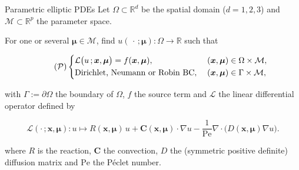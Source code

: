 \begin{frame}{Parametric elliptic PDEs}
	Let $\Omega \subset \mathbb{R}^d$ be the spatial domain ($d=1,2,3$) and $\mathcal{M} \subset \mathbb{R}^p$ the parameter space.

	For one or several $\bm{\mu}\in \mathcal{M}$, find $u(\,\cdot\,;\bm{\mu}): \Omega\to \mathbb{R}$ such that

	\begin{equation}\label{eq:pde}\tag{$\mathcal{P}$}
		\left\{
		\begin{aligned}
			 & \mathcal{L}\big(u\,;\bm{x},\bm{\mu}\big) = f(\bm{x},\bm{\mu}), \; &  & (\bm{x},\bm{\mu}) \in \Omega \times \mathcal{M}, \\
			 & \text{Dirichlet, Neumann or Robin BC}, \;                         &  & (\bm{x},\bm{\mu}) \in \Gamma \times \mathcal{M},
		\end{aligned}
		\right.
	\end{equation}

	with $\Gamma:=\partial \Omega$ the boundary of $\Omega$,	$f$ the source term and $\mathcal{L}$ the linear differential operator defined by

	\begin{equation*}
		\mathcal{L}(\cdot\,;\bm{x},\bm{\mu}) : u \mapsto R(\bm{x},\bm{\mu})\, u + \bm{C}(\bm{x},\bm{\mu}) \cdot \nabla u - \frac{1}{\text{Pe}} \nabla \cdot \big(D(\bm{x},\bm{\mu}) \nabla u\big).
	\end{equation*}

	where $R$ is the reaction, $\bm{C}$ the convection, $D$ the (symmetric positive definite) diffusion matrix and $\text{Pe}$ the Péclet number.
\end{frame}
